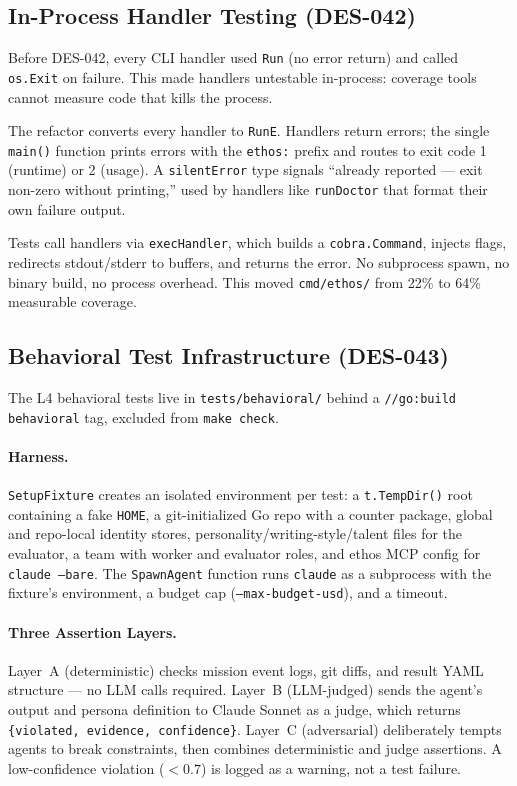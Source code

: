 \documentclass[a4paper,10pt]{article}
\newcommand{\pkg}[1]{\texttt{#1}}
\newcommand{\cmd}[1]{\texttt{#1}}
\newcommand{\fpath}[1]{\texttt{#1}}
\begin{document}
\subsection{In-Process Handler Testing (DES-042)}

Before DES-042, every CLI handler used \texttt{Run} (no error return)
and called \texttt{os.Exit} on failure.  This made handlers untestable
in-process: coverage tools cannot measure code that kills the process.

The refactor converts every handler to \texttt{RunE}.  Handlers return
errors; the single \texttt{main()} function prints errors with the
\texttt{ethos:} prefix and routes to exit code 1 (runtime) or 2
(usage).  A \texttt{silentError} type signals ``already reported ---
exit non-zero without printing,'' used by handlers like
\texttt{runDoctor} that format their own failure output.

Tests call handlers via \texttt{execHandler}, which builds a
\texttt{cobra.Command}, injects flags, redirects stdout/stderr to
buffers, and returns the error.  No subprocess spawn, no binary
build, no process overhead.  This moved \pkg{cmd/ethos/} from 22\% to
64\% measurable coverage.

\subsection{Behavioral Test Infrastructure (DES-043)}

The L4 behavioral tests live in \fpath{tests/behavioral/} behind a
\texttt{//go:build behavioral} tag, excluded from \cmd{make check}.

\paragraph{Harness.}
\texttt{SetupFixture} creates an isolated environment per test: a
\texttt{t.TempDir()} root containing a fake \texttt{HOME}, a
git-initialized Go repo with a counter package, global and repo-local
identity stores, personality/writing-style/talent files for the
evaluator, a team with worker and evaluator roles, and ethos MCP
config for \cmd{claude --bare}.  The \texttt{SpawnAgent} function
runs \cmd{claude} as a subprocess with the fixture's environment,
a budget cap (\texttt{--max-budget-usd}), and a timeout.

\paragraph{Three Assertion Layers.}
Layer~A (deterministic) checks mission event logs, git diffs, and
result YAML structure --- no LLM calls required.  Layer~B
(LLM-judged) sends the agent's output and persona definition to
Claude Sonnet as a judge, which returns
\texttt{\{violated, evidence, confidence\}}.  Layer~C (adversarial)
deliberately tempts agents to break constraints, then combines
deterministic and judge assertions.  A low-confidence violation
($<0.7$) is logged as a warning, not a test failure.
\end{document}
